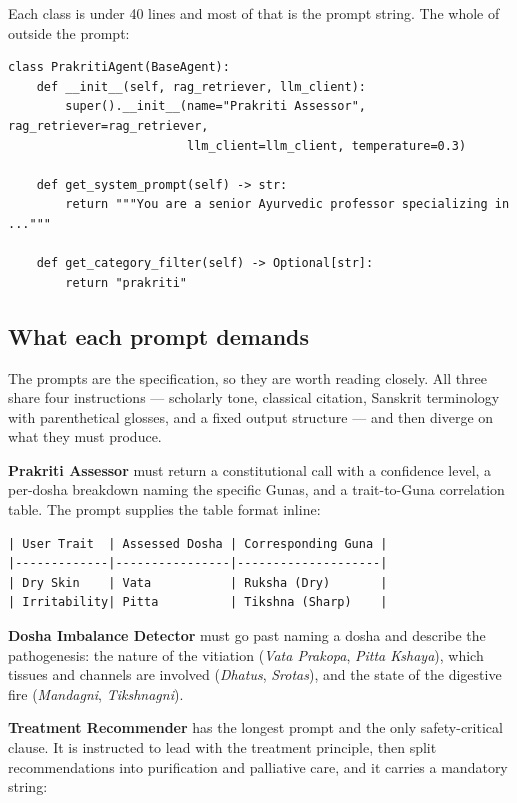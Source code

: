 Each class is under 40 lines and most of that is the prompt string. The whole of  outside the prompt:

\begin{lstlisting}[style=py]
class PrakritiAgent(BaseAgent):
    def __init__(self, rag_retriever, llm_client):
        super().__init__(name="Prakriti Assessor", rag_retriever=rag_retriever,
                         llm_client=llm_client, temperature=0.3)

    def get_system_prompt(self) -> str:
        return """You are a senior Ayurvedic professor specializing in ..."""

    def get_category_filter(self) -> Optional[str]:
        return "prakriti"
\end{lstlisting}

\subsection{What each prompt demands}

The prompts are the specification, so they are worth reading closely. All three share four instructions --- scholarly tone, classical citation, Sanskrit terminology with parenthetical glosses, and a fixed output structure --- and then diverge on what they must produce.

\textbf{Prakriti Assessor} must return a constitutional call with a confidence level, a per-dosha breakdown naming the specific Gunas, and a trait-to-Guna correlation table. The prompt supplies the table format inline:

\begin{lstlisting}[style=plain]
| User Trait  | Assessed Dosha | Corresponding Guna |
|-------------|----------------|--------------------|
| Dry Skin    | Vata           | Ruksha (Dry)       |
| Irritability| Pitta          | Tikshna (Sharp)    |
\end{lstlisting}

\textbf{Dosha Imbalance Detector} must go past naming a dosha and describe the pathogenesis: the nature of the vitiation (\emph{Vata Prakopa}, \emph{Pitta Kshaya}), which tissues and channels are involved (\emph{Dhatus}, \emph{Srotas}), and the state of the digestive fire (\emph{Mandagni}, \emph{Tikshnagni}).

\textbf{Treatment Recommender} has the longest prompt and the only safety-critical clause. It is instructed to lead with the treatment principle, then split recommendations into purification and palliative care, and it carries a mandatory string:

